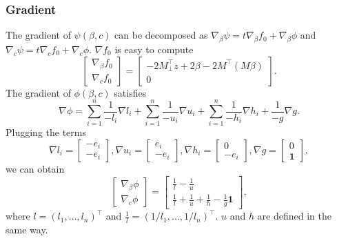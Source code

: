 \documentclass[final,onefignum,onetabnum]{siamart190516}
\begin{document}
\subsubsection{Gradient}
The gradient of $\psi(\beta,c)$ can be decomposed as $\nabla_{\beta}\psi = t\nabla_{\beta} f_0 + \nabla_{\beta}\phi$ and $\nabla_{c}\psi = t\nabla_{c} f_0 + \nabla_{c}\phi$. $\nabla f_0$ is easy to compute
\begin{equation}
    \begin{bmatrix}
    \nabla_{\beta} f_0\\
    \nabla_{c} f_0
    \end{bmatrix} = \begin{bmatrix}-2M_{\perp}^\top z + 2\beta - 2 M^\top (M\beta)\\ 0\end{bmatrix}.
\end{equation}
The gradient of $\phi(\beta,c)$ satisfies
\begin{equation}
    \nabla \phi = \sum_{i=1}^n\frac{1}{-l_i}\nabla l_i + \sum_{i=1}^n\frac{1}{-u_i}\nabla u_i + \sum_{i=1}^n\frac{1}{-h_i}\nabla h_i + \frac{1}{-g}\nabla g.
\end{equation}
Plugging the terms
\begin{equation}
     \nabla l_i = \begin{bmatrix}-e_i\\-e_i\end{bmatrix}, 
    \nabla u_i = \begin{bmatrix}e_i\\-e_i\end{bmatrix},
    \nabla h_i = \begin{bmatrix}0\\-e_i\end{bmatrix},
    \nabla g = \begin{bmatrix}0\\\mathbf{1}\end{bmatrix},
\end{equation}
we can obtain
\begin{equation}
    \begin{bmatrix}
    \nabla_{\beta}\phi\\
    \nabla_{c}\phi
    \end{bmatrix} = \begin{bmatrix} \frac{1}{l} - \frac{1}{u} \\ \frac{1}{l} + \frac{1}{u} + \frac{1}{h} - \frac{1}{g}\mathbf{1}\end{bmatrix},
\end{equation}
where $l = (l_1,\dots,l_n)^\top$ and $\frac{1}{l} = (1/l_1,\dots,1/l_n)^\top$. $u$ and $h$ are defined in the same way.
\end{document}
